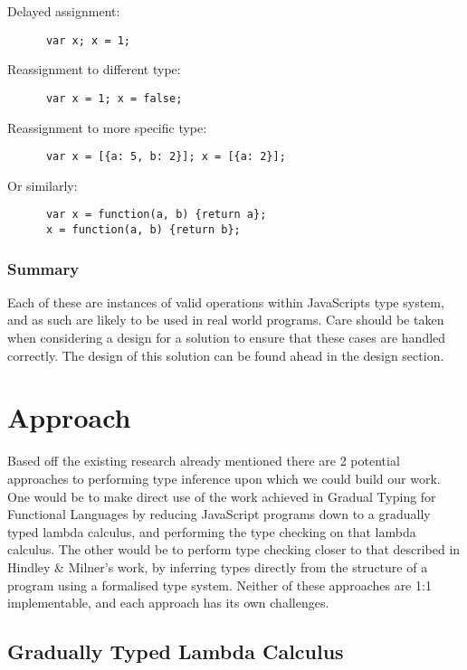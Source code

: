 \documentclass[british, twoside, openright]{bhamthesis}
\theoremstyle{definition}
\begin{document}
    Delayed assignment:
    \begin{lstlisting}
      var x; x = 1;
    \end{lstlisting}

    Reassignment to different type:
    \begin{lstlisting}
      var x = 1; x = false;
    \end{lstlisting}

    Reassignment to more specific type:
    \begin{lstlisting}
      var x = [{a: 5, b: 2}]; x = [{a: 2}];
    \end{lstlisting}

    Or similarly:
    \begin{lstlisting}
      var x = function(a, b) {return a};
      x = function(a, b) {return b};
    \end{lstlisting}

  \subsubsection{Summary}

    Each of these are instances of valid operations within JavaScripts type system, and as such are likely to be used in real world programs. Care should be taken when considering a design for a solution to ensure that these cases are handled correctly. The design of this solution can be found ahead in the design section.

  \section{Approach}

    Based off the existing research already mentioned there are 2 potential approaches to performing type inference upon which we could build our work. One would be to make direct use of the work achieved in Gradual Typing for Functional Languages\autocite{Siek2006} by reducing JavaScript programs down to a gradually typed lambda calculus, and performing the type checking on that lambda calculus. The other would be to perform type checking closer to that described in  Hindley \& Milner's work, by inferring types directly from the structure of a program using a formalised type system. Neither of these approaches are 1:1 implementable, and each approach has its own challenges.

  \subsection{Gradually Typed Lambda Calculus}
\end{document}
